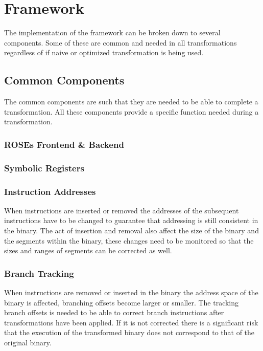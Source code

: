 \chapter{Framework}
The implementation of the framework can be broken down to several components.
Some of these are common and needed in all transformations regardless
of if naive or optimized transformation is being used.

\section{Common Components}
The common components are such that they are needed to be able
to complete a transformation. All these components provide a
specific function needed during a transformation.

\subsection{ROSEs Frontend \& Backend}

\subsection{Symbolic Registers}



\subsection{Instruction Addresses}
When instructions are inserted or removed the addresses of the
subsequent instructions have to be changed to guarantee that
addressing is still consistent in the binary. The act of insertion
and removal also affect the size of the binary and the segments
within the binary, these changes need to be monitored so that
the sizes and ranges of segments can be corrected as well.


\subsection{Branch Tracking}
When instructions are removed or inserted in the binary the address
space of the binary is affected, branching offsets become larger
or smaller. The tracking branch offsets is needed to be able to correct
branch instructions after transformations have been applied.
If it is not corrected there is a significant risk that
the execution of the transformed binary does not correspond to that of the
original binary.

